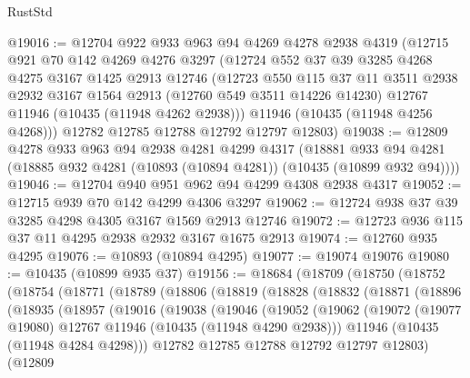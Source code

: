 \begin{lexlean}{RustStd}
\begin{coremodule}
@19016 := @12704
    @922
    @933
    @963
    @94
    @4269
    @4278
    @2938
    @4319
    (@12715
      @921
      @70
      @142
      @4269
      @4276
      @3297
      (@12724
        @552
        @37
        @39
        @3285
        @4268
        @4275
        @3167
        @1425
        @2913
        @12746
        (@12723
          @550
          @115
          @37
          @11
          @3511
          @2938
          @2932
          @3167
          @1564
          @2913
          (@12760 @549 @3511 @14226 @14230)
          @12767
          @11946
          (@10435 (@11948 @4262 @2938)))
        @11946
        (@10435 (@11948 @4256 @4268)))
      @12782
      @12785
      @12788
      @12792
      @12797
      @12803)
@19038 := @12809
    @4278
    @933
    @963
    @94
    @2938
    @4281
    @4299
    @4317
    (@18881 @933 @94 @4281 (@18885 @932 @4281 (@10893 (@10894 @4281)) (@10435 (@10899 @932 @94))))
@19046 := @12704 @940 @951 @962 @94 @4299 @4308 @2938 @4317
@19052 := @12715 @939 @70 @142 @4299 @4306 @3297
@19062 := @12724 @938 @37 @39 @3285 @4298 @4305 @3167 @1569 @2913 @12746
@19072 := @12723 @936 @115 @37 @11 @4295 @2938 @2932 @3167 @1675 @2913
@19074 := @12760 @935 @4295
@19076 := @10893 (@10894 @4295)
@19077 := @19074 @19076
@19080 := @10435 (@10899 @935 @37)
@19156 := @18684
    (@18709
      (@18750
        (@18752
          (@18754
            (@18771
              (@18789
                (@18806
                  (@18819
                    (@18828
                      (@18832
                        (@18871
                          (@18896
                            (@18935
                              (@18957
                                (@19016
                                  (@19038
                                    (@19046
                                      (@19052
                                        (@19062
                                          (@19072
                                            (@19077 @19080)
                                            @12767
                                            @11946
                                            (@10435 (@11948 @4290 @2938)))
                                          @11946
                                          (@10435 (@11948 @4284 @4298)))
                                        @12782
                                        @12785
                                        @12788
                                        @12792
                                        @12797
                                        @12803)
                                      (@12809

\end{coremodule}
\end{lexlean}
